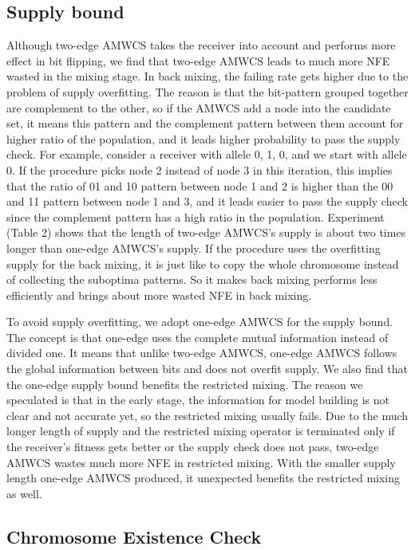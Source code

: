 \documentclass{sig-alternate-05-2015}
\begin{document}
\subsection{Supply bound}
Although two-edge AMWCS takes the receiver  into account and performs more effect in bit flipping, we find that two-edge AMWCS leads to much more NFE wasted in the mixing stage. In back mixing, the failing rate gets higher due to the problem of supply overfitting. The reason is that the bit-pattern grouped together are complement to the other, so if the AMWCS add a node into the candidate set, it means this pattern and the complement pattern between them account for higher ratio of the population, and it leads higher probability to pass the supply check. For example, consider a receiver with allele {0, 1, 0}, and we start with allele 0. If the procedure picks node 2 instead of node 3 in this iteration, this implies that the ratio of 01 and 10 pattern between node 1 and 2 is higher than the 00 and 11 pattern between node 1 and 3, and it leads easier to pass the supply check since the complement pattern has a high ratio in the population. Experiment (Table 2) shows that  the length of two-edge AMWCS’s supply is about two times longer than one-edge AMWCS’s supply. If the procedure uses the overfitting supply for the back mixing, it is just like to copy the whole chromosome instead of collecting the suboptima patterns. So it makes back mixing performs less efficiently   and brings about more  wasted NFE in back mixing.


To avoid supply overfitting, we adopt one-edge AMWCS for the supply bound. The concept is that one-edge uses the complete mutual information instead of divided one. It means that unlike two-edge AMWCS, one-edge AMWCS follows the global information between bits  and does not overfit supply. We also find that the one-edge supply bound benefits the restricted mixing. The reason we speculated is that in the early stage, the information for model building is not clear and not accurate yet, so the restricted mixing usually fails. Due to the much longer length of supply and the restricted mixing operator is terminated only if the receiver’s fitness gets better or the supply check does not pass, two-edge AMWCS  wastes much more NFE in restricted mixing. With the smaller supply length one-edge AMWCS produced, it unexpected benefits the restricted mixing as well.   


\subsection{Chromosome Existence Check}
\end{document}
